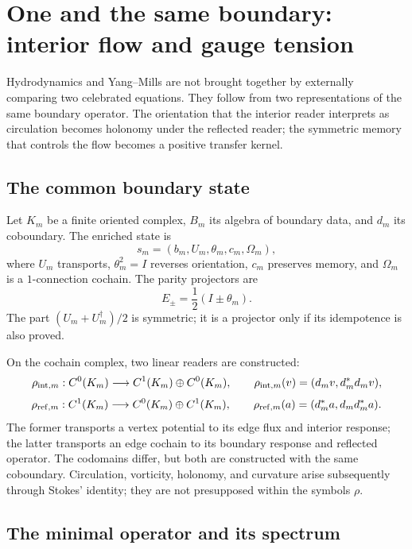 \chapter{One and the same boundary: interior flow and gauge tension}
\label{chap:hoja-comun-ns-ym}

Hydrodynamics and Yang--Mills are not brought together by externally comparing two
celebrated equations. They follow from two representations of the same boundary
operator. The orientation that the interior reader interprets as circulation
becomes holonomy under the reflected reader; the symmetric memory
that controls the flow becomes a positive transfer kernel.

\section{The common boundary state}

Let \(K_m\) be a finite oriented complex, \(B_m\) its algebra of boundary
data, and \(d_m\) its coboundary. The enriched state is
\[
 s_m=(b_m,U_m,\theta_m,c_m,\Omega_m),
\]
where \(U_m\) transports, \(\theta_m^2=I\) reverses orientation,
\(c_m\) preserves memory, and \(\Omega_m\) is a \(1\)-connection cochain.
The parity projectors are
\[
 E_\pm=\frac12(I\pm\theta_m).
\]
The part \((U_m+U_m^\dagger)/2\) is symmetric; it is a projector only if its
idempotence is also proved.

On the cochain complex, two linear readers are constructed:
\[
 \rho_{{\rm int},m}:C^0(K_m)\longrightarrow
 C^1(K_m)\oplus C^0(K_m),
\qquad
 \rho_{{\rm int},m}(v)=(d_mv,d_m^\ast d_mv),
\]
\[
 \rho_{{\rm ref},m}:C^1(K_m)\longrightarrow
 C^0(K_m)\oplus C^1(K_m),
\qquad
 \rho_{{\rm ref},m}(a)=(d_m^\ast a,d_md_m^\ast a).
\]
The former transports a vertex potential to its edge flux and interior
response; the latter transports an edge cochain to its boundary response and
reflected operator. The codomains differ, but both are constructed with the
same coboundary. Circulation, vorticity, holonomy, and curvature arise
subsequently through Stokes' identity; they are not presupposed within the
symbols \(\rho\).

\section{The minimal operator and its spectrum}

